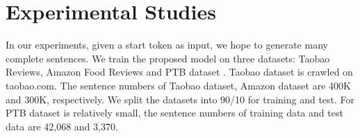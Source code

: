 \documentclass{llncs}
\begin{document}
\section{Experimental Studies}
In our experiments, given a start token as input, we hope to generate many complete sentences. We train the proposed model on three datasets: Taobao Reviews, Amazon Food Reviews and PTB dataset \cite{marcus1993building}. Taobao dataset is crawled on taobao.com. The sentence numbers of Taobao  dataset, Amazon dataset are 400K and 300K, respectively.  We split the datasets into 90/10 for training and test. For PTB dataset is relatively small, the sentence numbers of training data and test data  are 42,068 and 3,370.
\end{document}

